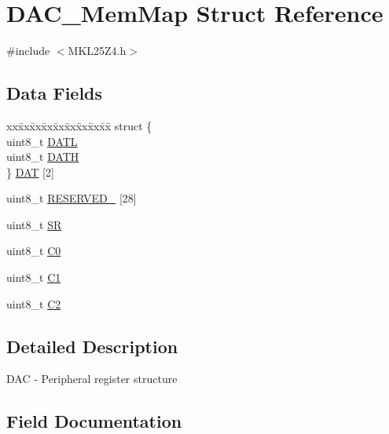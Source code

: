 \hypertarget{struct_d_a_c___mem_map}{}\section{D\+A\+C\+\_\+\+Mem\+Map Struct Reference}
\label{struct_d_a_c___mem_map}


{\ttfamily \#include $<$M\+K\+L25\+Z4.\+h$>$}

\subsection*{Data Fields}
\begin{DoxyCompactItemize}
\item 
\begin{tabbing}
xx\=xx\=xx\=xx\=xx\=xx\=xx\=xx\=xx\=\kill
struct \{\\
\>uint8\_t \hyperlink{struct_d_a_c___mem_map_a906a4999a740a6bc4fd750743203c7a1}{DATL}\\
\>uint8\_t \hyperlink{struct_d_a_c___mem_map_a4de933f720c069768296b4dc0a0f0499}{DATH}\\
\} \hyperlink{struct_d_a_c___mem_map_aea16d20ab6b876466f78b34fab9325c3}{DAT} \mbox{[}2\mbox{]}\\

\end{tabbing}\item 
uint8\+\_\+t \hyperlink{struct_d_a_c___mem_map_abc36545658b11a98b00c51de3a3c5d42}{R\+E\+S\+E\+R\+V\+E\+D\+\_} \mbox{[}28\mbox{]}
\item 
uint8\+\_\+t \hyperlink{struct_d_a_c___mem_map_a05bb2d07a6ae315af41ebe1bb7cd3d5c}{SR}
\item 
uint8\+\_\+t \hyperlink{struct_d_a_c___mem_map_a88317928f6b49bb03517258dd5fd5423}{C0}
\item 
uint8\+\_\+t \hyperlink{struct_d_a_c___mem_map_a8286c9d870f31a089d95e6a2285fbe2f}{C1}
\item 
uint8\+\_\+t \hyperlink{struct_d_a_c___mem_map_acdf8ac8ab339152eaed13f4eca300aa5}{C2}
\end{DoxyCompactItemize}


\subsection{Detailed Description}
D\+AC -\/ Peripheral register structure 

\subsection{Field Documentation}
\mbox{\label{struct_d_a_c___mem_map_a88317928f6b49bb03517258dd5fd5423}} 
